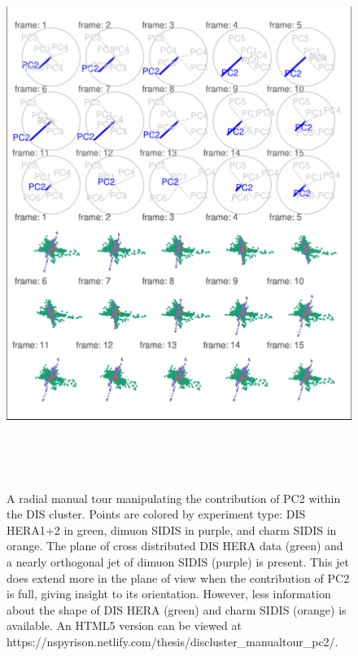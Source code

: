 \begin{Schunk}
\begin{figure}

{\centering \includegraphics[width=5.83in,height=7in]{spinifex_paper_files/figure-latex/DISclusterBad-1} 

}

\caption[A radial manual tour manipulating the contribution of PC2 within the DIS cluster]{A radial manual tour manipulating the contribution of PC2 within the DIS cluster. Points are colored by experiment type: DIS HERA1+2 in green, dimuon SIDIS in purple, and charm SIDIS in orange. The plane of cross distributed DIS HERA data (green) and a nearly orthogonal jet of dimuon SIDIS (purple) is present. This jet does extend more in the plane of view when the contribution of PC2 is full, giving insight to its orientation. However, less information about the shape of DIS HERA (green) and charm SIDIS (orange) is available. An HTML5 version can be viewed at https://nspyrison.netlify.com/thesis/discluster\_manualtour\_pc2/.}\label{fig:DISclusterBad}
\end{figure}
\end{Schunk}

